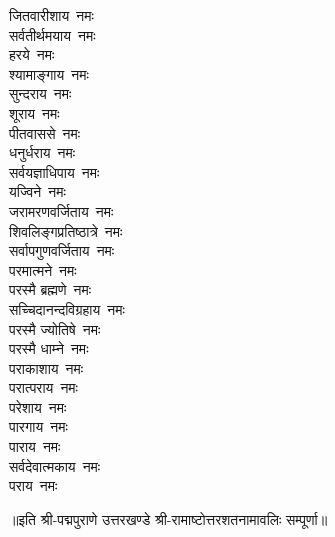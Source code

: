 \begin{multicols}{2}
\begin{flushleft}
जितवारीशाय~नमः\\
सर्वतीर्थमयाय~नमः\\
हरये~नमः\\
श्यामाङ्गाय~नमः\\
सुन्दराय~नमः\\
शूराय~नमः\\
पीतवाससे~नमः\hfill{}\\
धनुर्धराय~नमः\\
सर्वयज्ञाधिपाय~नमः\\
यज्विने~नमः\\
जरामरणवर्जिताय~नमः\\
शिवलिङ्गप्रतिष्ठात्रे~नमः\\
सर्वापगुणवर्जिताय~नमः\\
परमात्मने~नमः\\
परस्मै ब्रह्मणे~नमः\\
सच्चिदानन्दविग्रहाय~नमः\\
परस्मै ज्योतिषे~नमः\hfill{}\\
परस्मै धाम्ने~नमः\\
पराकाशाय~नमः\\
परात्पराय~नमः\\
परेशाय~नमः\\
पारगाय~नमः\\
पाराय~नमः\\
सर्वदेवात्मकाय~नमः\\
पराय~नमः\\
\end{flushleft}
\end{multicols}
॥इति श्री-पद्मपुराणे उत्तरखण्डे श्री-रामाष्टोत्तरशतनामावलिः सम्पूर्णा॥
